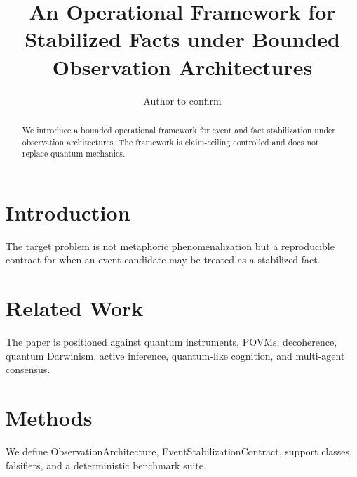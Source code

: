 \documentclass{article}
\title{An Operational Framework for Stabilized Facts under Bounded Observation Architectures}
\author{Author to confirm}
\begin{document}
\maketitle
\begin{abstract}
We introduce a bounded operational framework for event and fact stabilization under observation architectures. The framework is claim-ceiling controlled and does not replace quantum mechanics.
\end{abstract}
\section{Introduction}
The target problem is not metaphoric phenomenalization but a reproducible contract for when an event candidate may be treated as a stabilized fact.
\section{Related Work}
The paper is positioned against quantum instruments, POVMs, decoherence, quantum Darwinism, active inference, quantum-like cognition, and multi-agent consensus.
\section{Methods}
We define ObservationArchitecture, EventStabilizationContract, support classes, falsifiers, and a deterministic benchmark suite.
\end{document}
